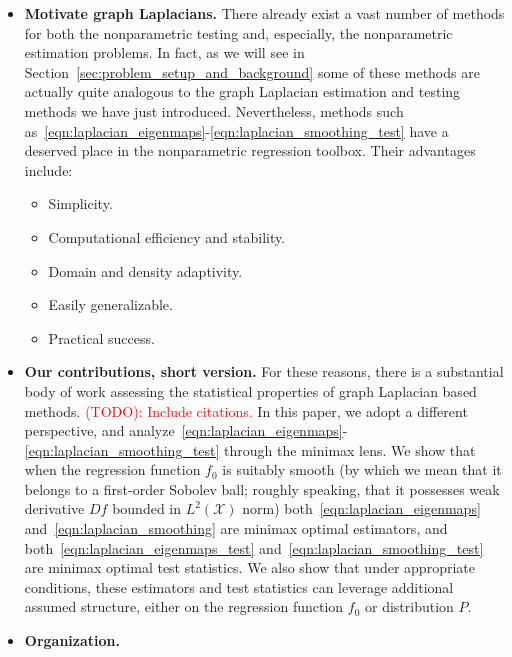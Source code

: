\documentclass{article}
\newcommand{\1}{\mathbf{1}}
\newcommand{\Xset}{\mathcal{X}}
\theoremstyle{alden}
\theoremstyle{aldenthm}
\theoremstyle{definition}
\theoremstyle{remark}
\begin{document}
\begin{itemize}
	\item \textbf{Motivate graph Laplacians.} There already exist a vast number of methods for both the nonparametric testing and, especially, the nonparametric estimation problems. In fact, as we will see in Section~\ref{sec:problem_setup_and_background} some of these methods are actually quite analogous to the graph Laplacian estimation and testing methods we have just introduced. Nevertheless, methods such as~\eqref{eqn:laplacian_eigenmaps}-\eqref{eqn:laplacian_smoothing_test} have a deserved place in the nonparametric regression toolbox. Their advantages include:
	\begin{itemize}
		\item Simplicity.
		\item Computational efficiency and stability.
		\item Domain and density adaptivity.
		\item Easily generalizable.
		\item Practical success.
	\end{itemize}
	\item \textbf{Our contributions, short version.} For these reasons, there is a  substantial body of work assessing the statistical properties of graph Laplacian based methods. \textcolor{red}{(TODO): Include citations.} In this paper, we adopt a different perspective, and analyze~\eqref{eqn:laplacian_eigenmaps}-\eqref{eqn:laplacian_smoothing_test} through the minimax lens. We show that when the regression function $f_0$ is suitably smooth (by which we mean that it belongs to a first-order Sobolev ball; roughly speaking, that it possesses weak derivative $Df$ bounded in $L^2(\Xset)$ norm) both~\eqref{eqn:laplacian_eigenmaps} and~\eqref{eqn:laplacian_smoothing} are minimax optimal estimators, and both~\eqref{eqn:laplacian_eigenmaps_test} and~\eqref{eqn:laplacian_smoothing_test} are minimax optimal test statistics. We also show that under appropriate conditions, these estimators and test statistics can leverage additional assumed structure, either on the regression function $f_0$ or distribution $P$.
	\item \textbf{Organization.}
\end{itemize}
\end{document}
